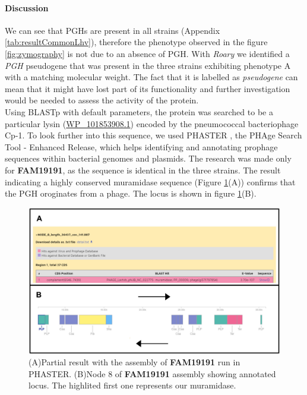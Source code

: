 \documentclass[10pt,a4paper]{article}
\begin{document}




\paragraph{Discussion} We can see that PGHs are present in all strains (Appendix \ref{tab:resultCommonLhv}), therefore the phenotype observed in the figure \ref{fig:zymography} is not due to an absence of PGH. With \textit{Roary} we identified a \textit{PGH} pseudogene that was present in the three strains exhibiting phenotype A with a matching molecular weight. The fact that it is labelled as \textit{pseudogene} can mean that it might have lost part of its functionality and further investigation would be needed to assess the activity of the protein.\\

\noindent Using BLASTp\cite{altschul_gapped_1997} with default parameters, the protein was searched to be a particular lysin (\href{https://www.ncbi.nlm.nih.gov/protein/1325986555}{WP\_101853908.1}) encoded by the pneumococcal bacteriophage Cp-1\cite{martin_pneumococcal_1998}. To look further into this sequence, we used PHASTER \cite{arndt_phaster:_2016}, the PHAge Search Tool - Enhanced Release, which helps identifying and annotating prophage sequences within bacterial genomes and plasmids. The research was made only for \textbf{FAM19191}, as the sequence is identical in the three strains. The result indicating a highly conserved muramidase sequence (Figure \ref{fig:phasterresultmuramidase}(A)) confirms that the PGH oroginates from a phage. The locus is shown in figure \ref{fig:phasterresultmuramidase}(B). 

\begin{figure}[H]
	\centering
	\includegraphics[width=0.7\linewidth]{img/fasterfasterfucker}
	\caption{(A)Partial result with the assembly of \textbf{FAM19191} run in PHASTER. (B)Node 8 of \textbf{FAM19191} assembly showing annotated locus. The highlited first one represents our muramidase.}
	\label{fig:phasterresultmuramidase}
\end{figure}
\end{document}
